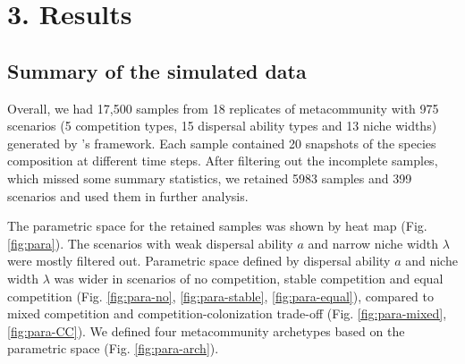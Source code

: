 \chapter*{3. Results}
\setcounter{chapter}{3}
	\section{Summary of the simulated data}
	\noindent
	Overall, we had 17,500 samples from 18 replicates of metacommunity with 975 scenarios (5 competition types, 15 dispersal ability types and 13 niche widths) generated by \citeauthor{thompson2020process}'s framework. Each sample contained 20 snapshots of the species composition at different time steps. After filtering out the incomplete samples, which missed some summary statistics, we retained 5983 samples and 399 scenarios and used them in further analysis.
	
	The parametric space for the retained samples was shown by heat map (Fig. \ref{fig:para}). The scenarios with weak dispersal ability $a$ and narrow niche width $\lambda$ were mostly filtered out. Parametric space defined by dispersal ability $a$ and niche width $\lambda$ was wider in scenarios of no competition, stable competition and equal competition (Fig. \ref{fig:para-no}, \ref{fig:para-stable}, \ref{fig:para-equal}), compared to mixed competition and competition-colonization trade-off (Fig. \ref{fig:para-mixed}, \ref{fig:para-CC}). We defined four metacommunity archetypes based on the parametric space (Fig. \ref{fig:para-arch}).
	
